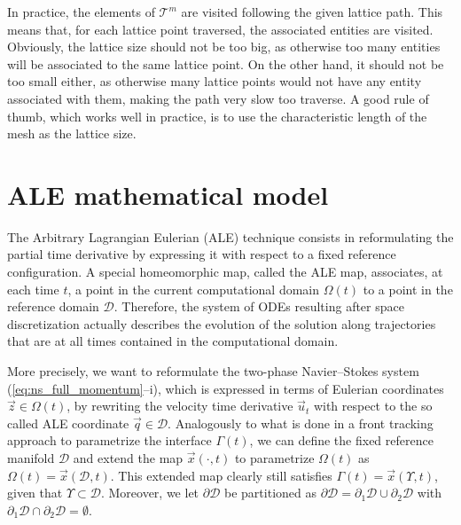 \documentclass[a4paper,12pt,onecolumn]{article}
\newcommand{\D}{\mathcal D}
\begin{document}
In practice, the elements of $\mathcal{T}^m$ are visited following the given
lattice path. This means that, for each lattice point traversed, the associated
entities are visited. Obviously, the lattice size should not be too big, as
otherwise too many entities will be associated to the same lattice point. On the
other hand, it should not be too small either, as otherwise many lattice points
would not have any entity associated with them, making the path very slow too
traverse. A good rule of thumb, which works well in practice, is to use the
characteristic length of the mesh as the lattice size.

\section{ALE mathematical model}\label{sec:ale_model}
The Arbitrary Lagrangian Eulerian (ALE) technique consists in
reformulating the partial time derivative by expressing it with respect to a
fixed reference configuration. A special homeomorphic map, called the ALE map,
associates, at each time $t$, a point in the current computational domain
$\Omega(t)$ to a point in the reference domain $\D$. Therefore, the system of
ODEs resulting after space discretization actually describes the evolution of
the solution along trajectories that are at all times contained in the
computational domain.

More precisely, we want to reformulate the two-phase Navier--Stokes system
(\ref{eq:ns_full_momentum}--i), which is expressed in terms of Eulerian
coordinates $\vec z\in\Omega(t)$, by rewriting the velocity time derivative
$\vec u_t$ with respect to the so called ALE coordinate $\vec q \in \D$.
Analogously to what is done in a front tracking approach to parametrize the
interface $\Gamma(t)$, we can define the fixed reference manifold $\D$ and
extend the map $\vec x(\cdot,t)$ to parametrize $\Omega(t)$ as
$\Omega(t)=\vec x(\D,t)$. This extended map clearly still satisfies $\Gamma(t)
= \vec x(\Upsilon,t)$, given that $\Upsilon\subset\D$. Moreover, we let
$\partial\D$ be partitioned as $\partial\D=\partial_1\D \cup \partial_2\D$
with $\partial_1\D \cap \partial_2\D = \emptyset$.
\end{document}
